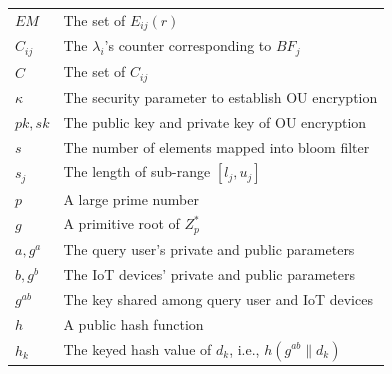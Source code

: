 \documentclass[IEEE JOURNAL OF BIOMEDICAL AND HEALTH INFORMATICS]{IEEEtran}
\begin{document}
\begin{table}[h]
\begin{tabular}{ll}
		$EM$             & The set of $E_{ij}(r)$\\
		$C_{ij}$           &  The $\lambda_i$'s counter corresponding to $BF_j$\\
		$C$                & The set of $C_{ij}$\\
		$\kappa$           & The security parameter to establish OU encryption\\
		$pk, sk$           & The public key and private key of OU encryption\\
		$s$                & The number of elements mapped into bloom filter\\
		$s_j$              & The length of sub-range $[l_j, u_j]$ \\ 
		$p$ 			   & A large prime number\\
		$g$ 			   & A primitive root of $Z^{*}_p$\\
		$a, g^a$ 		   & The query user's private and public parameters\\
		$b, g^b$ 		   & The IoT devices' private and public parameters\\
		$g^{ab}$           & The key shared among query user and IoT devices\\
		$h$                & A public hash function\\
		$h_k$              & The keyed hash value of $d_k$, i.e., $h(g^{ab} \| d_k)$\\
		\hline
	\end{tabular}
\end{table}
\end{document}
